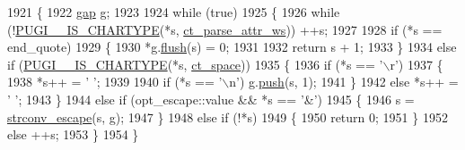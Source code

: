 \begin{DoxyCode}
1921         \{
1922             \hyperlink{structgap}{gap} g;
1923 
1924             \textcolor{keywordflow}{while} (\textcolor{keyword}{true})
1925             \{
1926                 \textcolor{keywordflow}{while} (!\hyperlink{pugixml_8cpp_a2adf5ae9b7505408a18e9f3bb1b3d332}{PUGI\_\_IS\_CHARTYPE}(*s, \hyperlink{pugixml_8cpp_ae83a55e5947d28c62625b690b1484108a8ac9b7ded4827803524b87f772f17c51}{ct\_parse\_attr\_ws})) ++s;
1927                 
1928                 \textcolor{keywordflow}{if} (*s == end\_quote)
1929                 \{
1930                     *g.\hyperlink{structgap_a176c58ee8d57c41b91ae9f00d5e8cab5}{flush}(s) = 0;
1931                 
1932                     \textcolor{keywordflow}{return} s + 1;
1933                 \}
1934                 \textcolor{keywordflow}{else} \textcolor{keywordflow}{if} (\hyperlink{pugixml_8cpp_a2adf5ae9b7505408a18e9f3bb1b3d332}{PUGI\_\_IS\_CHARTYPE}(*s, \hyperlink{pugixml_8cpp_ae83a55e5947d28c62625b690b1484108ac957a1774b6a4430e583bcb881909372}{ct\_space}))
1935                 \{
1936                     \textcolor{keywordflow}{if} (*s == \textcolor{charliteral}{'\(\backslash\)r'})
1937                     \{
1938                         *s++ = \textcolor{charliteral}{' '};
1939                 
1940                         \textcolor{keywordflow}{if} (*s == \textcolor{charliteral}{'\(\backslash\)n'}) g.\hyperlink{structgap_a9c0d0b12bc778c8439c8aec7747ab2b0}{push}(s, 1);
1941                     \}
1942                     \textcolor{keywordflow}{else} *s++ = \textcolor{charliteral}{' '};
1943                 \}
1944                 \textcolor{keywordflow}{else} \textcolor{keywordflow}{if} (opt\_escape::value && *s == \textcolor{charliteral}{'&'})
1945                 \{
1946                     s = \hyperlink{pugixml_8cpp_a7cf2b6da7b109a11f8cb1c7e1a09bf7e}{strconv\_escape}(s, g);
1947                 \}
1948                 \textcolor{keywordflow}{else} \textcolor{keywordflow}{if} (!*s)
1949                 \{
1950                     \textcolor{keywordflow}{return} 0;
1951                 \}
1952                 \textcolor{keywordflow}{else} ++s;
1953             \}
1954         \}
\end{DoxyCode}
